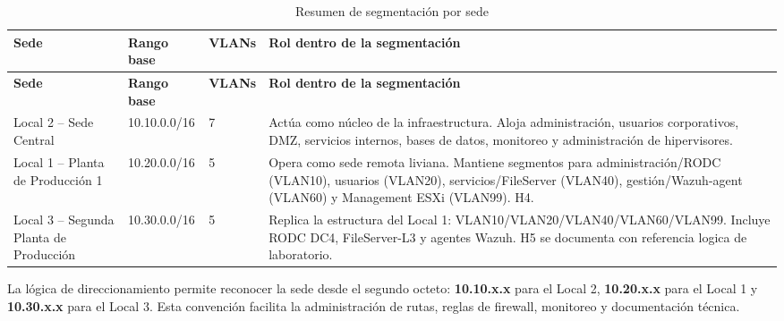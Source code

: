 \documentclass[11pt, a4paper, oneside]{report}
\begin{document}
\begin{xltabular}{\textwidth}{@{}|L{3.2cm}|L{3cm}|N{2cm}|X|@{}}
\caption{Resumen de segmentación por sede}
\label{tab:resumen_segmentacion_sede} \\

\parbox[c][1.1cm][c]{\linewidth}{\centering\color{white}\bfseries\small Sede} &
\parbox[c][1.1cm][c]{\linewidth}{\centering\color{white}\bfseries\small Rango base} &
\parbox[c][1.1cm][c]{\linewidth}{\centering\color{white}\bfseries\small VLANs} &
\parbox[c][1.1cm][c]{\linewidth}{\centering\color{white}\bfseries\small Rol dentro de la segmentación} \\ \hline
\endfirsthead

\parbox[c][1.1cm][c]{\linewidth}{\centering\color{white}\bfseries\small Sede} &
\parbox[c][1.1cm][c]{\linewidth}{\centering\color{white}\bfseries\small Rango base} &
\parbox[c][1.1cm][c]{\linewidth}{\centering\color{white}\bfseries\small VLANs} &
\parbox[c][1.1cm][c]{\linewidth}{\centering\color{white}\bfseries\small Rol dentro de la segmentación} \\ \hline
\endhead

\hline
\endfoot

{\small Local 2 -- Sede Central} &
{\small 10.10.0.0/16} &
{\small 7} &
{\small Actúa como núcleo de la infraestructura. Aloja administración, usuarios corporativos, DMZ, servicios internos, bases de datos, monitoreo y administración de hipervisores.} \\ \hline

{\small Local 1 -- Planta de Producción 1} &
{\small 10.20.0.0/16} &
{\small 5} &
{\small Opera como sede remota liviana. Mantiene segmentos para administración/RODC (VLAN10), usuarios (VLAN20), servicios/FileServer (VLAN40), gestión/Wazuh-agent (VLAN60) y Management ESXi (VLAN99). H4.} \\ \hline

{\small Local 3 -- Segunda Planta de Producción} &
{\small 10.30.0.0/16} &
{\small 5} &
{\small Replica la estructura del Local 1: VLAN10/VLAN20/VLAN40/VLAN60/VLAN99. Incluye RODC DC4, FileServer-L3 y agentes Wazuh. H5 se documenta con referencia logica de laboratorio.} \\ \hline

\end{xltabular}

\normalsize

La lógica de direccionamiento permite reconocer la sede desde el segundo octeto: \textbf{10.10.x.x} para el Local 2, \textbf{10.20.x.x} para el Local 1 y \textbf{10.30.x.x} para el Local 3. Esta convención facilita la administración de rutas, reglas de firewall, monitoreo y documentación técnica.
\end{document}
